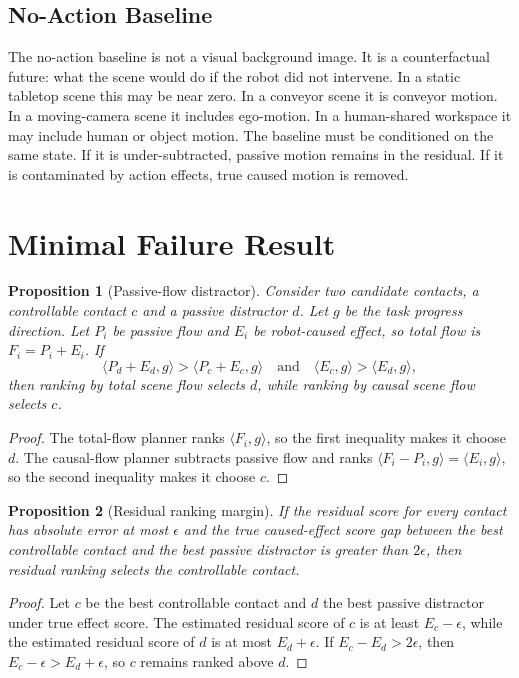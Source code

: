 \documentclass{article}
\newtheorem{proposition}{Proposition}
\begin{document}
\subsection{No-Action Baseline}

The no-action baseline is not a visual background image.  It is a counterfactual future:
what the scene would do if the robot did not intervene.  In a static tabletop scene this
may be near zero.  In a conveyor scene it is conveyor motion.  In a moving-camera scene
it includes ego-motion.  In a human-shared workspace it may include human or object
motion.  The baseline must be conditioned on the same state.  If it is under-subtracted,
passive motion remains in the residual.  If it is contaminated by action effects, true
caused motion is removed.

\section{Minimal Failure Result}

\begin{proposition}[Passive-flow distractor]
Consider two candidate contacts, a controllable contact $c$ and a passive distractor
$d$.  Let $g$ be the task progress direction.  Let $P_i$ be passive flow and $E_i$ be
robot-caused effect, so total flow is $F_i=P_i+E_i$.  If
\[
  \langle P_d+E_d,g\rangle > \langle P_c+E_c,g\rangle
  \quad\text{and}\quad
  \langle E_c,g\rangle > \langle E_d,g\rangle,
\]
then ranking by total scene flow selects $d$, while ranking by causal scene flow selects
$c$.
\end{proposition}

\begin{proof}
The total-flow planner ranks $\langle F_i,g\rangle$, so the first inequality makes it
choose $d$.  The causal-flow planner subtracts passive flow and ranks
$\langle F_i-P_i,g\rangle=\langle E_i,g\rangle$, so the second inequality makes it choose
$c$.
\end{proof}

\begin{proposition}[Residual ranking margin]
If the residual score for every contact has absolute error at most $\epsilon$ and the
true caused-effect score gap between the best controllable contact and the best passive
distractor is greater than $2\epsilon$, then residual ranking selects the controllable
contact.
\end{proposition}

\begin{proof}
Let $c$ be the best controllable contact and $d$ the best passive distractor under true
effect score.  The estimated residual score of $c$ is at least $E_c-\epsilon$, while the
estimated residual score of $d$ is at most $E_d+\epsilon$.  If $E_c-E_d>2\epsilon$, then
$E_c-\epsilon>E_d+\epsilon$, so $c$ remains ranked above $d$.
\end{proof}
\end{document}
